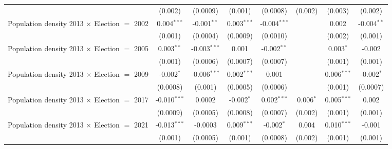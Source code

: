 \begin{table}[htbp]
\begin{tabular}{lccccccc}
                                                              & (0.002)              & (0.0009)              & (0.001)               & (0.0008)       & (0.002)        & (0.003)        & (0.002)\\   
      Population density 2013 $\times$ Election $=$ 2002      & 0.004$^{***}$        & -0.001$^{**}$         & 0.003$^{***}$         & -0.004$^{***}$ &                & 0.002          & -0.004$^{**}$\\   
                                                              & (0.001)              & (0.0004)              & (0.0009)              & (0.0010)       &                & (0.002)        & (0.001)\\   
      Population density 2013 $\times$ Election $=$ 2005      & 0.003$^{**}$         & -0.003$^{***}$        & 0.001                 & -0.002$^{**}$  &                & 0.003$^{*}$    & -0.002\\   
                                                              & (0.001)              & (0.0006)              & (0.0007)              & (0.0007)       &                & (0.001)        & (0.001)\\   
      Population density 2013 $\times$ Election $=$ 2009      & -0.002$^{*}$         & -0.006$^{***}$        & 0.002$^{***}$         & 0.001          &                & 0.006$^{***}$  & -0.002$^{*}$\\   
                                                              & (0.0008)             & (0.001)               & (0.0005)              & (0.0006)       &                & (0.001)        & (0.0007)\\   
      Population density 2013 $\times$ Election $=$ 2017      & -0.010$^{***}$       & 0.0002                & -0.002$^{*}$          & 0.002$^{***}$  & 0.006$^{*}$    & 0.005$^{***}$  & 0.002\\   
                                                              & (0.0009)             & (0.0005)              & (0.0008)              & (0.0007)       & (0.002)        & (0.001)        & (0.001)\\   
      Population density 2013 $\times$ Election $=$ 2021      & -0.013$^{***}$       & -0.0003               & 0.009$^{***}$         & -0.002$^{*}$   & 0.004          & 0.010$^{***}$  & -0.001\\   
                                                              & (0.001)              & (0.0005)              & (0.001)               & (0.0008)       & (0.002)        & (0.001)        & (0.001)\\   

\end{tabular}
\end{table}
